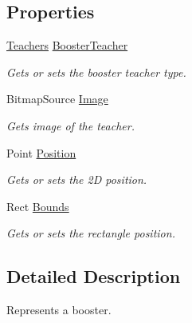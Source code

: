 \subsection*{Properties}
\begin{DoxyCompactItemize}
\item 
\mbox{\hyperlink{namespace_o_e_invaders_1_1_library_ad26529e6e309f95c10efa56a99f0b80e}{Teachers}} \mbox{\hyperlink{class_o_e_invaders_1_1_library_1_1_booster_a38b23e143b2a6769b5578991ed895cc0}{Booster\+Teacher}}
\begin{DoxyCompactList}\small\item\em Gets or sets the booster teacher type. \end{DoxyCompactList}\item 
Bitmap\+Source \mbox{\hyperlink{class_o_e_invaders_1_1_library_1_1_booster_a3ef872db16bb7e09e48df7032c01e595}{Image}}
\begin{DoxyCompactList}\small\item\em Gets image of the teacher. \end{DoxyCompactList}\item 
Point \mbox{\hyperlink{class_o_e_invaders_1_1_library_1_1_booster_a9651a55313c6b78aacbccd827c73cb2c}{Position}}
\begin{DoxyCompactList}\small\item\em Gets or sets the 2D position. \end{DoxyCompactList}\item 
Rect \mbox{\hyperlink{class_o_e_invaders_1_1_library_1_1_booster_ab4caac459aabcee8eb03bb920a75a045}{Bounds}}
\begin{DoxyCompactList}\small\item\em Gets or sets the rectangle position. \end{DoxyCompactList}\end{DoxyCompactItemize}


\subsection{Detailed Description}
Represents a booster. 



